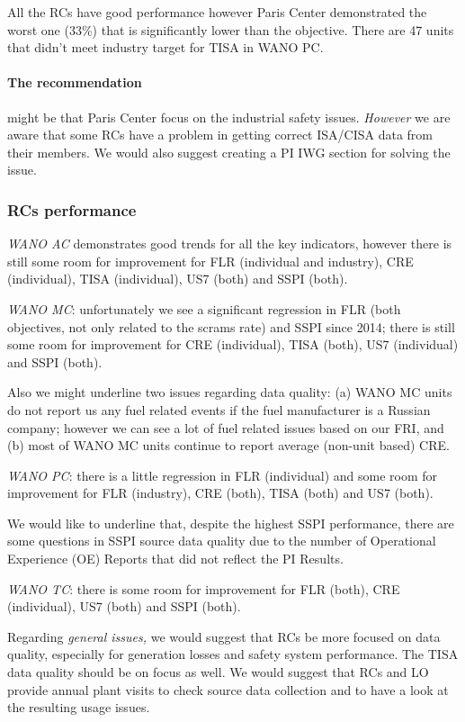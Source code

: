 All the RCs have good performance however Paris Center
demonstrated the worst one (33\%) that is significantly lower than the
objective. There are 47 units that didn't meet
industry target for TISA in WANO PC.

\paragraph{The recommendation} might be that Paris Center focus on
the industrial safety issues. \emph{However} we are aware that
some RCs have a problem in getting correct ISA/CISA data from
their members. We would also suggest creating a PI IWG section for
solving the issue.

\subsubsection*{RCs performance} 

\emph{WANO AC} demonstrates good trends
for all the key indicators, however there is still some room for
improvement for FLR (individual and industry), CRE (individual), TISA
(individual), US7 (both) and SSPI (both).

\emph{WANO MC}: unfortunately we see a significant regression
in FLR (both objectives, not only related to the scrams rate) and SSPI
since 2014;  there is still some room for
improvement for CRE (individual), TISA (both), US7 (individual) and
SSPI (both).

Also we might underline two issues regarding data quality: (a) WANO
MC units do not report us any fuel related events if the fuel
manufacturer is a Russian company; however we can see a lot of fuel
related issues based on our FRI, and (b) most of WANO MC units
continue to report average (non-unit based) CRE.

\emph{WANO PC}: there is a little regression in FLR (individual)
and some room for improvement for FLR (industry), CRE (both), TISA
(both) and US7 (both).

We would like to underline that, despite the highest SSPI performance,
there are some questions in SSPI source data quality due to the number of
Operational Experience (OE) Reports that did not reflect the PI
Results.

\emph{WANO TC}: there is some room for improvement for FLR
(both), CRE (individual), US7 (both) and SSPI (both).

Regarding \emph{general issues,} we would suggest that RCs be more focused
on data quality, especially for generation losses and safety system
performance. The TISA data quality should be on focus as well. We would
suggest that RCs and LO provide annual plant visits to check source
data collection and to have a look at the resulting usage issues.